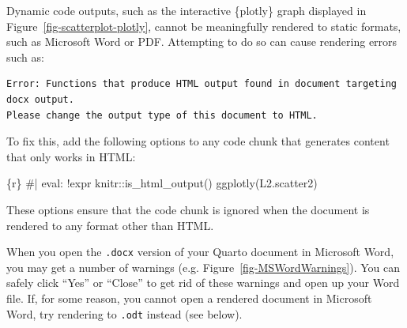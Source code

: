 \documentclass[
  letterpaper,
  DIV=11,
  numbers=noendperiod]{scrreprt}
\newenvironment{Shaded}{\begin{snugshade}}{\end{snugshade}}
\newcommand{\CommentTok}[1]{\textcolor[rgb]{0.37,0.37,0.37}{#1}}
\newcommand{\FunctionTok}[1]{\textcolor[rgb]{0.28,0.35,0.67}{#1}}
\newcommand{\InformationTok}[1]{\textcolor[rgb]{0.37,0.37,0.37}{#1}}
\newcommand{\NormalTok}[1]{\textcolor[rgb]{0.00,0.23,0.31}{#1}}
\begin{document}
\begin{tcolorbox}[enhanced jigsaw, arc=.35mm, bottomrule=.15mm, bottomtitle=1mm, breakable, colback=white, colbacktitle=quarto-callout-warning-color!10!white, colframe=quarto-callout-warning-color-frame, coltitle=black, left=2mm, leftrule=.75mm, opacityback=0, opacitybacktitle=0.6, rightrule=.15mm, title=\textcolor{quarto-callout-warning-color}{\faExclamationTriangle}\hspace{0.5em}{Not rendering code chunks in specific formats}, titlerule=0mm, toprule=.15mm, toptitle=1mm]

Dynamic code outputs, such as the interactive \{plotly\} graph displayed
in Figure~\ref{fig-scatterplot-plotly}, cannot be meaningfully rendered
to static formats, such as Microsoft Word or PDF. Attempting to do so
can cause rendering errors such as:

\begin{verbatim}
Error: Functions that produce HTML output found in document targeting docx output.
Please change the output type of this document to HTML.
\end{verbatim}

To fix this, add the following options to any code chunk that generates
content that only works in HTML:

\begin{Shaded}
\begin{Highlighting}[]
\InformationTok{\textasciigrave{}\textasciigrave{}\textasciigrave{}\{r\}}
\CommentTok{\#| eval: !expr \textquotesingle{}knitr::is\_html\_output()\textquotesingle{}}
\FunctionTok{ggplotly}\NormalTok{(L2.scatter2)}
\InformationTok{\textasciigrave{}\textasciigrave{}\textasciigrave{}}
\end{Highlighting}
\end{Shaded}

These options ensure that the code chunk is ignored when the document is
rendered to any format other than HTML.

\end{tcolorbox}

When you open the \texttt{.docx} version of your Quarto document in
Microsoft Word, you may get a number of warnings (e.g.
Figure~\ref{fig-MSWordWarnings}). You can safely click ``Yes'' or
``Close'' to get rid of these warnings and open up your Word file. If,
for some reason, you cannot open a rendered document in Microsoft Word,
try rendering to \texttt{.odt} instead (see below).
\end{document}
